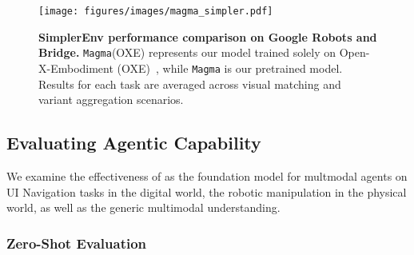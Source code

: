 \begin{figure*}[!t]
    \centering
    \texttt{[image: figures/images/magma\_simpler.pdf]}
    \vspace{-0.6cm}
    \caption{\textbf{SimplerEnv performance comparison on Google Robots and Bridge.} \texttt{Magma}(OXE) represents our model trained solely on Open-X-Embodiment (OXE)~\cite{embodimentcollaboration2024openxembodimentroboticlearning}, while \texttt{Magma} is our pretrained model. Results for each task are averaged across visual matching and variant aggregation scenarios.}
    \label{fig:simpler_env}
\vspace{-10pt}
\end{figure*}

\subsection{Evaluating Agentic Capability}

We examine the effectiveness of \magma as the foundation model for multmodal agents on UI Navigation tasks in the digital world, the robotic manipulation in the physical world, as well as the generic multimodal understanding.

\subsubsection{Zero-Shot Evaluation}

